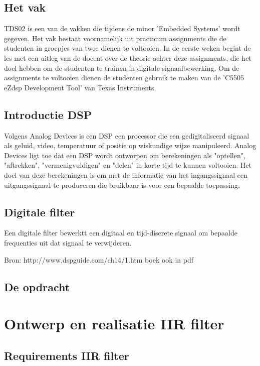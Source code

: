 \documentclass[11pt,a4paper]{article}
\begin{document}
		\subsection{Het vak}
		TDS02 is een van de vakken die tijdens de minor 'Embedded Systems' wordt gegeven. Het vak bestaat voornamelijk uit practicum assignments die de studenten in groepjes van twee dienen te voltooien. In de eerste weken begint de les met een uitleg van de docent over de theorie achter deze assignments, die het doel hebben om de studenten te trainen in digitale signaalbewerking. Om de assignments te voltooien dienen de studenten gebruik te maken van de 'C5505 eZdsp Development Tool' van Texas Instruments.
		
		\subsection{Introductie DSP}
		Volgens Analog Devices \cite{analog} is een DSP een processor die een  	gedigitaliseerd signaal als geluid, video, temperatuur of positie op wiskundige wijze manipuleerd. Analog Devices ligt toe dat een DSP wordt ontworpen om berekeningen als "optellen", "aftrekken", "vermenigvuldigen" en "delen" in korte tijd te kunnen voltooien. Het doel van deze berekeningen is om met de informatie van het ingangssignaal een uitgangssignaal te produceren die bruikbaar is voor een bepaalde toepassing. 
		
		\subsection{Digitale filter}
		Een digitale filter bewerktt een digitaal en tijd-discrete signaal om bepaalde frequenties uit dat signaal te verwijderen.
		
		Bron: http://www.dspguide.com/ch14/1.htm
		boek ook in pdf  			
		
		\subsection{De opdracht}		
		
	
	
	\section{Ontwerp en realisatie IIR filter}
		
		\subsection{Requirements IIR filter}
	
\end{document}
